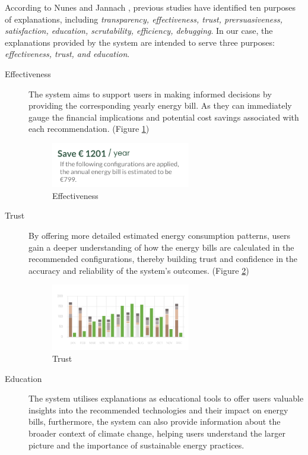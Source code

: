 According to Nunes and Jannach \cite{Nunes2020}, previous studies have identified ten purposes of explanations, including 
\emph{transparency, effectiveness, trust, prersuasiveness, satisfaction, education, scrutability, efficiency, debugging}.
In our case, the explanations provided by the system are intended to serve three purposes: 
\emph{effectiveness, trust, and education}. 
\begin{description}
  \item[Effectiveness] The system aims to support users in making informed decisions by providing the corresponding yearly energy bill. 
    As they can immediately gauge the financial implications and potential cost savings associated with each recommendation. (Figure \ref{fig:effectiveness})
    \begin{figure}[h]
      \centering
      \includegraphics[width=0.6\textwidth]{Images/effectiveness.png}
      \caption{Effectiveness}
      \label{fig:effectiveness}
    \end{figure}
  \item[Trust] By offering more detailed estimated energy consumption patterns, users gain a deeper understanding of how the energy bills are calculated in the recommended configurations, 
    thereby building trust and confidence in the accuracy and reliability of the system's outcomes. (Figure \ref{fig:trust})
    \begin{figure}[h]
      \centering
      \includegraphics[width=0.6\textwidth]{Images/trust.png}
      \caption{Trust}
      \label{fig:trust}
    \end{figure}
  \item[Education] The system utilises explanations as educational tools to offer users valuable insights into the recommended technologies and their impact on energy bills, 
    furthermore, the system can also provide information about the broader context of climate change, helping users understand the larger picture and the importance of sustainable energy practices.
\end{description}


